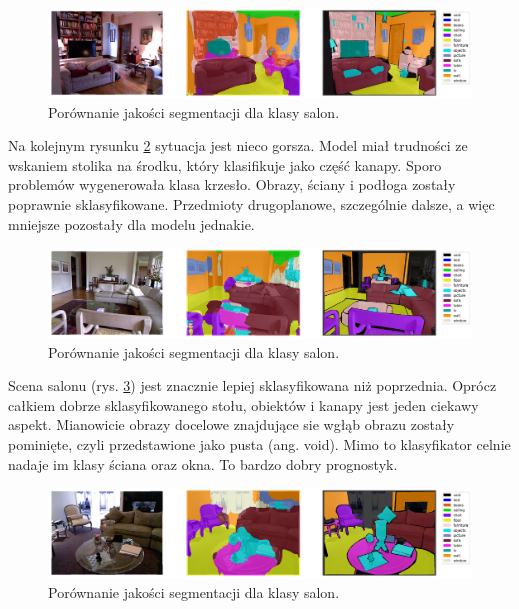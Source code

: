 \begin{figure}[ht!]
    \centering
    \includegraphics[width=\textwidth]{img/preds_analysis/gt_vs_pred/living_room-1.png}
    \caption{Porównanie jakości segmentacji dla klasy salon.}
    \label{fig:living_room-pred-1}
\end{figure}

Na kolejnym rysunku \ref{fig:living_room-pred-2} sytuacja jest nieco gorsza. Model miał trudności ze wskaniem stolika na środku, który klasifikuje jako część kanapy. Sporo problemów wygenerowała klasa krzesło. Obrazy, ściany i podłoga zostały poprawnie sklasyfikowane. Przedmioty drugoplanowe, szczególnie dalsze, a więc mniejsze pozostały dla modelu jednakie.
\begin{figure}[ht!]
    \centering
    \includegraphics[width=\textwidth]{img/preds_analysis/gt_vs_pred/living_room-2.png}
    \caption{Porównanie jakości segmentacji dla klasy salon.}
    \label{fig:living_room-pred-2}
\end{figure}

Scena salonu (rys. \ref{fig:living_room-pred-3}) jest znacznie lepiej sklasyfikowana niż poprzednia. Oprócz całkiem dobrze sklasyfikowanego stołu, obiektów i kanapy jest jeden ciekawy aspekt. Mianowicie obrazy docelowe znajdujące sie wgłąb obrazu zostały pominięte, czyli przedstawione jako pusta (ang. void). Mimo to klasyfikator celnie nadaje im klasy ściana oraz okna. To bardzo dobry prognostyk.

\begin{figure}[ht!]
    \centering
    \includegraphics[width=\textwidth]{img/preds_analysis/gt_vs_pred/living_room-3.png}
    \caption{Porównanie jakości segmentacji dla klasy salon.}
    \label{fig:living_room-pred-3}
\end{figure}

